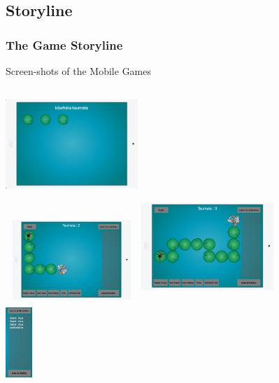\documentclass[aspectratio=169]{beamer}
\begin{document}
\subsection{Storyline}
\begin{frame}
\frametitle{The Game Storyline}
Screen-shots of the Mobile Games
\begin{columns}[t]
\centering
\includegraphics[width=5cm,height=3.5cm]{p2.png}\\
\includegraphics[width=5cm,height=3cm]{p3.png}
\centering
\includegraphics[width=5cm,height=4cm]{p4.png}\\
\includegraphics[width=1cm,height=3cm]{p5.png}\\
\end{columns}
\end{frame}
\end{document}
